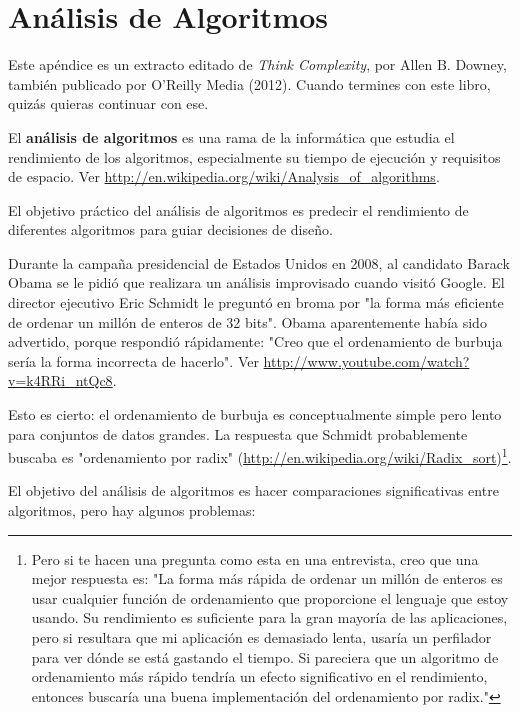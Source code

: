 \appendix

\chapter{Análisis de Algoritmos}

Este apéndice es un extracto editado de \textit{Think Complexity}, por Allen B. Downey, también publicado por O'Reilly Media (2012). Cuando termines con este libro, quizás quieras continuar con ese.

El \textbf{análisis de algoritmos} es una rama de la informática que estudia el rendimiento de los algoritmos, especialmente su tiempo de ejecución y requisitos de espacio. Ver \url{http://en.wikipedia.org/wiki/Analysis_of_algorithms}.

El objetivo práctico del análisis de algoritmos es predecir el rendimiento de diferentes algoritmos para guiar decisiones de diseño.

Durante la campaña presidencial de Estados Unidos en 2008, al candidato Barack Obama se le pidió que realizara un análisis improvisado cuando visitó Google. El director ejecutivo Eric Schmidt le preguntó en broma por "la forma más eficiente de ordenar un millón de enteros de 32 bits". Obama aparentemente había sido advertido, porque respondió rápidamente: "Creo que el ordenamiento de burbuja sería la forma incorrecta de hacerlo". Ver \url{http://www.youtube.com/watch?v=k4RRi_ntQc8}.

Esto es cierto: el ordenamiento de burbuja es conceptualmente simple pero lento para conjuntos de datos grandes. La respuesta que Schmidt probablemente buscaba es "ordenamiento por radix" (\url{http://en.wikipedia.org/wiki/Radix_sort})\footnote{Pero si te hacen una pregunta como esta en una entrevista, creo que una mejor respuesta es: "La forma más rápida de ordenar un millón de enteros es usar cualquier función de ordenamiento que proporcione el lenguaje que estoy usando. Su rendimiento es suficiente para la gran mayoría de las aplicaciones, pero si resultara que mi aplicación es demasiado lenta, usaría un perfilador para ver dónde se está gastando el tiempo. Si pareciera que un algoritmo de ordenamiento más rápido tendría un efecto significativo en el rendimiento, entonces buscaría una buena implementación del ordenamiento por radix."}.

El objetivo del análisis de algoritmos es hacer comparaciones significativas entre algoritmos, pero hay algunos problemas:

